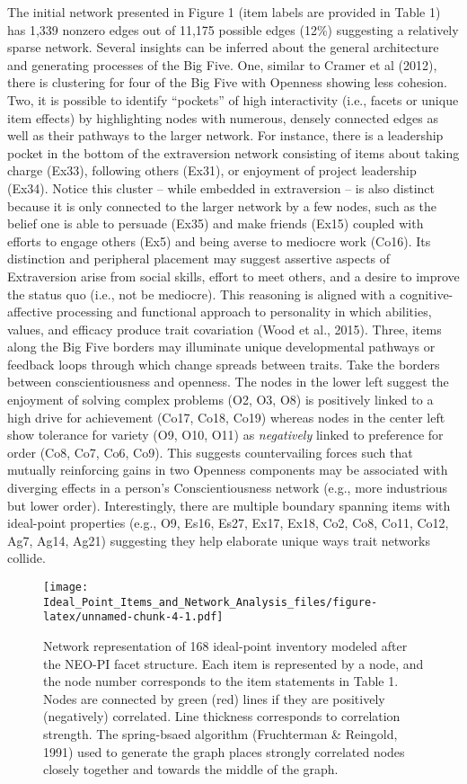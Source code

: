 \documentclass[english,man]{apa6}
\theoremstyle{definition}
\theoremstyle{definition}
\theoremstyle{remark}
\begin{document}
The initial network presented in Figure 1 (item labels are provided in
Table 1) has 1,339 nonzero edges out of 11,175 possible edges (12\%)
suggesting a relatively sparse network. Several insights can be inferred
about the general architecture and generating processes of the Big Five.
One, similar to Cramer et al (2012), there is clustering for four of the
Big Five with Openness showing less cohesion. Two, it is possible to
identify \enquote{pockets} of high interactivity (i.e., facets or unique
item effects) by highlighting nodes with numerous, densely connected
edges as well as their pathways to the larger network. For instance,
there is a leadership pocket in the bottom of the extraversion network
consisting of items about taking charge (Ex33), following others (Ex31),
or enjoyment of project leadership (Ex34). Notice this cluster -- while
embedded in extraversion -- is also distinct because it is only
connected to the larger network by a few nodes, such as the belief one
is able to persuade (Ex35) and make friends (Ex15) coupled with efforts
to engage others (Ex5) and being averse to mediocre work (Co16). Its
distinction and peripheral placement may suggest assertive aspects of
Extraversion arise from social skills, effort to meet others, and a
desire to improve the status quo (i.e., not be mediocre). This reasoning
is aligned with a cognitive-affective processing and functional approach
to personality in which abilities, values, and efficacy produce trait
covariation (Wood et al., 2015). Three, items along the Big Five borders
may illuminate unique developmental pathways or feedback loops through
which change spreads between traits. Take the borders between
conscientiousness and openness. The nodes in the lower left suggest the
enjoyment of solving complex problems (O2, O3, O8) is positively linked
to a high drive for achievement (Co17, Co18, Co19) whereas nodes in the
center left show tolerance for variety (O9, O10, O11) as
\emph{negatively} linked to preference for order (Co8, Co7, Co6, Co9).
This suggests countervailing forces such that mutually reinforcing gains
in two Openness components may be associated with diverging effects in a
person's Conscientiousness network (e.g., more industrious but lower
order). Interestingly, there are multiple boundary spanning items with
ideal-point properties (e.g., O9, Es16, Es27, Ex17, Ex18, Co2, Co8,
Co11, Co12, Ag7, Ag14, Ag21) suggesting they help elaborate unique ways
trait networks collide.

\begin{figure}[htbp]
\centering
\texttt{[image: Ideal\_Point\_Items\_and\_Network\_Analysis\_files/figure-latex/unnamed-chunk-4-1.pdf]}
\caption{\label{fig:unnamed-chunk-4}Network representation of 168
ideal-point inventory modeled after the NEO-PI facet structure. Each
item is represented by a node, and the node number corresponds to the
item statements in Table 1. Nodes are connected by green (red) lines if
they are positively (negatively) correlated. Line thickness corresponds
to correlation strength. The spring-bsaed algorithm (Fruchterman \&
Reingold, 1991) used to generate the graph places strongly correlated
nodes closely together and towards the middle of the graph.}
\end{figure}
\end{document}

